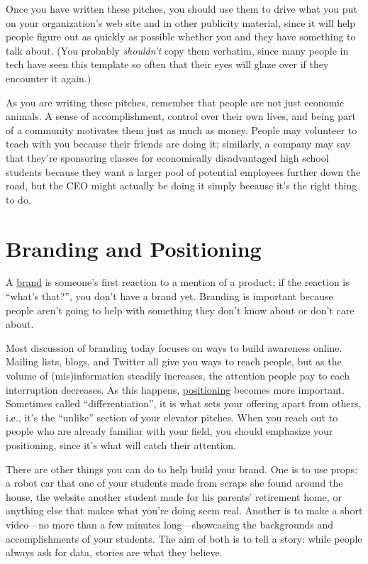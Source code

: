 Once you have written these pitches, you should use them to drive what
you put on your organization's web site and in other publicity material,
since it will help people figure out as quickly as possible whether you
and they have something to talk about. (You probably \emph{shouldn't} copy
them verbatim, since many people in tech have seen this template so
often that their eyes will glaze over if they encounter it again.)

As you are writing these pitches, remember that people are not just
economic animals. A sense of accomplishment, control over their own
lives, and being part of a community motivates them just as much as
money. People may volunteer to teach with you because their friends are
doing it; similarly, a company may say that they're sponsoring classes
for economically disadvantaged high school students because they want a
larger pool of potential employees further down the road, but the CEO
might actually be doing it simply because it's the right thing to do.

\section{Branding and Positioning}\label{s:marketing-branding}

A \protect\hyperlink{g:brand}{brand} is someone's first reaction to a mention
of a product; if the reaction is ``what's that?'', you don't have a brand
yet. Branding is important because people aren't going to help with
something they don't know about or don't care about.

Most discussion of branding today focuses on ways to build awareness
online. Mailing lists, blogs, and Twitter all give you ways to reach
people, but as the volume of (mis)information steadily increases, the
attention people pay to each interruption decreases. As this happens,
\protect\hyperlink{g:positioning}{positioning} becomes more important.
Sometimes called ``differentiation'', it is what sets your offering apart
from others, i.e., it's the ``unlike'' section of your elevator pitches.
When you reach out to people who are already familiar with your field,
you should emphasize your positioning, since it's what will catch their
attention.

There are other things you can do to help build your brand. One is to
use props: a robot car that one of your students made from scraps she
found around the house, the website another student made for his
parents' retirement home, or anything else that makes what you're
doing seem real. Another is to make a short video---no more than a few
minutes long---showcasing the backgrounds and accomplishments of your
students. The aim of both is to tell a story: while people always ask
for data, stories are what they believe.

